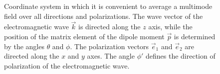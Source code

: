 \begin{figure}
\centering



\caption{Coordinate system in which it is convenient to average
  a multimode field over all directions and polarizations. The wave
  vector of the electromagnetic wave $\vec{k}$ is directed along the $z$ axis, while
  the position of the matrix element of the dipole moment $\vec{p}$
  is determined by the angles $\theta$ and $\phi$. The polarization vectors $\vec{e}_1$ and $\vec{e}_2$
are directed along the $x$ and $y$ axes. The angle $\phi'$ defines the direction
of polarization of the electromagnetic wave.}
\label{figPart1Ch2_6}
\end{figure}